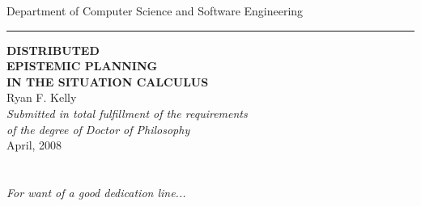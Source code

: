 %
%
%
%





\begin{titlepage}
\begin{center}
{\Large Department of Computer Science and Software Engineering}\\ \vspace{0.1cm}
\rule{150mm}{0.5mm}

\vspace{1cm}
{\bf\LARGE  DISTRIBUTED }\\ \vspace{0.3cm} %
{\bf\LARGE  EPISTEMIC PLANNING }\\ \vspace{0.3cm} %
{\bf\LARGE  IN THE SITUATION CALCULUS } \\ %
\vspace{2cm}
{\LARGE      Ryan F. Kelly       }\\
\vspace{5cm}
{\em\large Submitted in total fulfillment of the requirements}\\ \vspace{0.1cm}
{\em\large        of the degree of Doctor of Philosophy     }\\
\vspace{0.5cm}
{\Large             April, 2008        }\\
\vspace{0.5cm}
\end{center}
\end{titlepage}

\chapter*{ } %
\begin{center}
\emph{For want of a good dedication line...}
\end{center}





